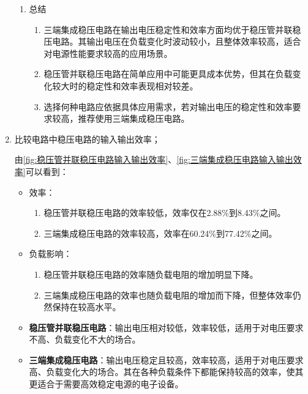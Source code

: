 \documentclass[dvipsnames, svgnames,a4paper,11pt]{article}
\begin{document}
\begin{enumerate}
\begin{enumerate}
					\item 总结
						\begin{enumerate}
							\item 三端集成稳压电路在输出电压稳定性和效率方面均优于稳压管并联稳压电路。其输出电压在负载变化时波动较小，且整体效率较高，适合对电源性能要求较高的应用场景。
							\item 稳压管并联稳压电路在简单应用中可能更具成本优势，但其在负载变化较大时的稳定性和效率表现相对较差。
							\item 选择何种电路应依据具体应用需求，若对输出电压的稳定性和效率要求较高，推荐使用三端集成稳压电路。
						\end{enumerate}
				\end{enumerate}










			\item 比较电路中稳压电路的输入输出效率；
			

				由\cref{fig:稳压管并联稳压电路输入输出效率}、\cref{fig:三端集成稳压电路输入输出效率}可以看到：

				\begin{itemize}
					\item 效率：
					
						\begin{enumerate}
							\item 稳压管并联稳压电路的效率较低，效率仅在2.88\%到8.43\%之间。
							\item 三端集成稳压电路的效率较高，效率在60.24\%到77.42\%之间。
							
						\end{enumerate}

					\item 负载影响：
					
						\begin{enumerate}
							\item 稳压管并联稳压电路的效率随负载电阻的增加明显下降。
							\item 三端集成稳压电路的效率也随负载电阻的增加而下降，但整体效率仍然保持在较高水平。
						\end{enumerate}

				\end{itemize}


				\begin{itemize}
					\item \textbf{稳压管并联稳压电路}：输出电压相对较低，效率较低，适用于对电压要求不高、负载变化不大的场合。
					\item \textbf{三端集成稳压电路}：输出电压稳定且较高，效率较高，适用于对电压要求高、负载变化大的场合。其在各种负载条件下都能保持较高的效率，使其更适合于需要高效稳定电源的电子设备。
				\end{itemize}






		\end{enumerate}
\end{document}
